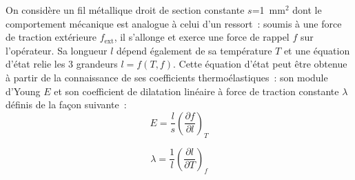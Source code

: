 On considère un fil métallique droit de section constante $s$=1~mm$^2 $ dont le comportement mécanique est analogue à celui d'un ressort~: soumis à une force de traction extérieure $f_{\mathrm{ext}}$, il s'allonge et exerce une force de rappel $f$ sur l'opérateur. Sa longueur $l$ dépend également de sa température $T$ et une équation d'état relie les 3 grandeurs $l = f(T,f)$. Cette équation d'état peut être obtenue à partir de la connaissance de ses coefficients thermoélastiques~: son module d'Young $E$ et son coefficient de dilatation linéaire à force de traction constante $\lambda$  définis de la façon suivante~:
\begin{equation}
E = \dfrac{l}{s} \left( \dfrac{\partial f}{\partial l} \right)_T
\end{equation}  

\begin{equation}
\lambda = \dfrac{1}{l} \left( \dfrac{\partial l}{\partial T} \right)_f
\end{equation}


